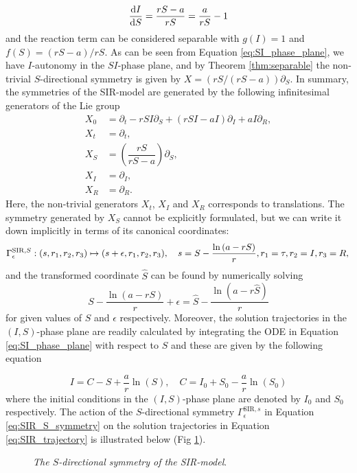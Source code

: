 \begin{equation}
\dv{I}{S}=\dfrac{rS-a}{rS}=\dfrac{a}{rS}-1
\label{eq:SI_phase_plane}
\end{equation}
and the reaction term can be considered separable with $g(I)=1$ and $f(S)=(rS-a)/rS$. As can be seen from Equation \eqref{eq:SI_phase_plane}, we have $I$-autonomy in the $SI$-phase plane, and by Theorem \ref{thm:separable} the non-trivial $S$-directional symmetry is given by $X=(rS/(rS-a))\partial_S$. In summary, the symmetries of the SIR-model are generated by the following infinitesimal generators of the Lie group
\begin{align} X_0&=\partial_t-rSI\partial_S+\left(rSI-aI\right)\partial_I+aI\partial_R\label{eq:SIR_0},\\
  X_t&=\partial_t\label{eq:SIR_t},\\
  X_S&=\left(\dfrac{rS}{rS-a}\right)\partial_S\label{eq:SIR_S},\\
  X_I&=\partial_I\label{eq:SIR_I},\\
  X_R&=\partial_R\label{eq:SIR_R}.
\end{align}
Here, the non-trivial generators $X_t$, $X_I$ and $X_R$ corresponds to translations. The symmetry generated by $X_S$ cannot be explicitly formulated, but we can write it down implicitly in terms of its canonical coordinates:
\begin{equation}
  \Gamma^{\mathrm{SIR},S}_{\epsilon}:(s,r_1,r_2,r_3)\mapsto(s+\epsilon,r_1,r_2,r_3),\quad s=S-\dfrac{\ln\left(a-rS\right)}{r},r_1=\tau,r_2=I,r_3=R,\\
  \label{eq:SIR_S_symmetry}
\end{equation}
and the transformed coordinate $\hat{S}$ can be found by numerically solving
\begin{equation}
  S-\dfrac{\ln\left(a-rS\right)}{r}+\epsilon=\hat{S}-\dfrac{\ln\left(a-r\hat{S}\right)}{r}
  \label{eq:SIR_S_symmetry_numerics}
\end{equation}
for given values of $S$ and $\epsilon$ respectively. Moreover, the solution trajectories in the $(I,S)$-phase plane are readily calculated by integrating the ODE in Equation \eqref{eq:SI_phase_plane} with respect to $S$ and these are given by the following equation \cite{murray2002}

\begin{equation}
  I=C-S+\dfrac{a}{r}\ln(S),\quad C=I_0+S_0-\dfrac{a}{r}\ln(S_0)
  \label{eq:SIR_trajectory}
\end{equation}
where the initial conditions in the $(I,S)$-phase plane are denoted by $I_0$ and $S_0$ respectively. The action of the $S$-directional symmetry $\Gamma^{\mathrm{SIR},s}_{\epsilon}$ in Equation \eqref{eq:SIR_S_symmetry} on the solution trajectories in Equation \eqref{eq:SIR_trajectory} is illustrated below (Fig \ref{fig:SIR_symmetry}). 


\begin{figure}[htbp!]
  \begin{center}
\caption{\textit{The $S$-directional symmetry of the SIR-model}. }
\label{fig:SIR_symmetry}
\end{center}
\end{figure}
